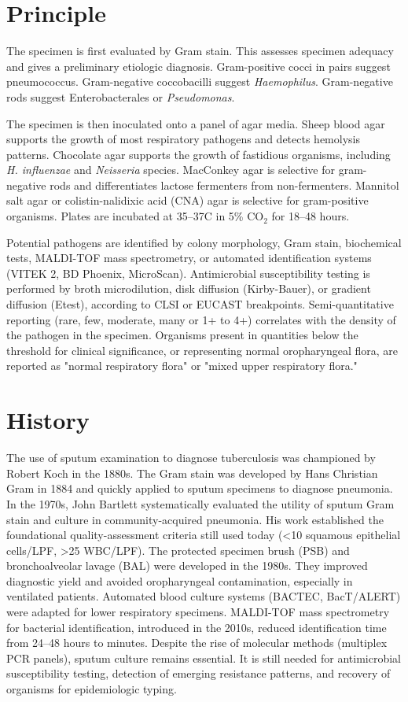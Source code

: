 \section*{Principle}
The specimen is first evaluated by Gram stain. This assesses specimen adequacy and gives a preliminary etiologic diagnosis. Gram-positive cocci in pairs suggest pneumococcus. Gram-negative coccobacilli suggest \textit{Haemophilus}. Gram-negative rods suggest Enterobacterales or \textit{Pseudomonas}.

The specimen is then inoculated onto a panel of agar media. Sheep blood agar supports the growth of most respiratory pathogens and detects hemolysis patterns. Chocolate agar supports the growth of fastidious organisms, including \textit{H. influenzae} and \textit{Neisseria} species. MacConkey agar is selective for gram-negative rods and differentiates lactose fermenters from non-fermenters. Mannitol salt agar or colistin-nalidixic acid (CNA) agar is selective for gram-positive organisms. Plates are incubated at 35--37\textdegree{}C in 5\% CO$_2$ for 18--48 hours.

Potential pathogens are identified by colony morphology, Gram stain, biochemical tests, MALDI-TOF mass spectrometry, or automated identification systems (VITEK 2, BD Phoenix, MicroScan). Antimicrobial susceptibility testing is performed by broth microdilution, disk diffusion (Kirby-Bauer), or gradient diffusion (Etest), according to CLSI or EUCAST breakpoints. Semi-quantitative reporting (rare, few, moderate, many or 1+ to 4+) correlates with the density of the pathogen in the specimen. Organisms present in quantities below the threshold for clinical significance, or representing normal oropharyngeal flora, are reported as "normal respiratory flora" or "mixed upper respiratory flora."

\section*{History}
The use of sputum examination to diagnose tuberculosis was championed by Robert Koch in the 1880s. The Gram stain was developed by Hans Christian Gram in 1884 and quickly applied to sputum specimens to diagnose pneumonia. In the 1970s, John Bartlett systematically evaluated the utility of sputum Gram stain and culture in community-acquired pneumonia. His work established the foundational quality-assessment criteria still used today (<10 squamous epithelial cells/LPF, >25 WBC/LPF). The protected specimen brush (PSB) and bronchoalveolar lavage (BAL) were developed in the 1980s. They improved diagnostic yield and avoided oropharyngeal contamination, especially in ventilated patients. Automated blood culture systems (BACTEC, BacT/ALERT) were adapted for lower respiratory specimens. MALDI-TOF mass spectrometry for bacterial identification, introduced in the 2010s, reduced identification time from 24--48 hours to minutes. Despite the rise of molecular methods (multiplex PCR panels), sputum culture remains essential. It is still needed for antimicrobial susceptibility testing, detection of emerging resistance patterns, and recovery of organisms for epidemiologic typing.

